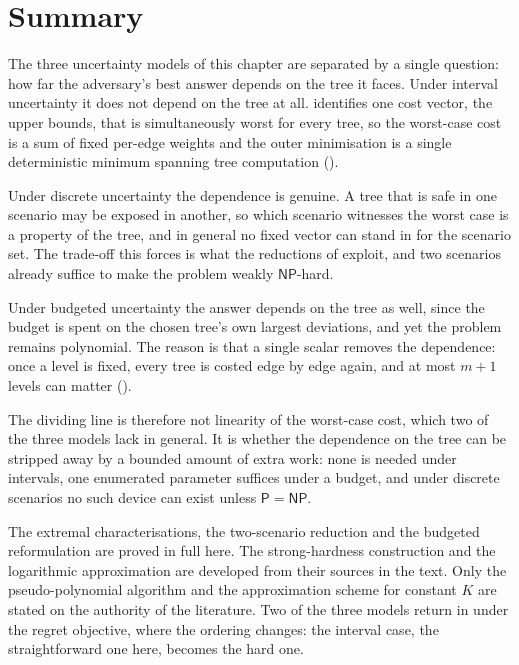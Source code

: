 \section*{Summary}

The three uncertainty models of this chapter are separated by a single question: how far the adversary's best answer depends on the tree it faces.
Under interval uncertainty it does not depend on the tree at all.
 identifies one cost vector, the upper bounds, that is simultaneously worst for every tree, so the worst-case cost is a sum of fixed per-edge weights and the outer minimisation is a single deterministic minimum spanning tree computation ().

Under discrete uncertainty the dependence is genuine.
A tree that is safe in one scenario may be exposed in another, so which scenario witnesses the worst case is a property of the tree, and in general no fixed vector can stand in for the scenario set.
The trade-off this forces is what the reductions of  exploit, and two scenarios already suffice to make the problem weakly $\mathsf{NP}$-hard.

Under budgeted uncertainty the answer depends on the tree as well, since the budget is spent on the chosen tree's own largest deviations, and yet the problem remains polynomial.
The reason is that a single scalar removes the dependence: once a level is fixed, every tree is costed edge by edge again, and at most $m + 1$ levels can matter ().

The dividing line is therefore not linearity of the worst-case cost, which two of the three models lack in general.
It is whether the dependence on the tree can be stripped away by a bounded amount of extra work: none is needed under intervals, one enumerated parameter suffices under a budget, and under discrete scenarios no such device can exist unless $\mathsf{P} = \mathsf{NP}$.

The extremal characterisations, the two-scenario reduction and the budgeted reformulation are proved in full here. The strong-hardness construction and the logarithmic approximation are developed from their sources in the text. Only the pseudo-polynomial algorithm and the approximation scheme for constant $K$ are stated on the authority of the literature.
Two of the three models return in  under the regret objective, where the ordering changes: the interval case, the straightforward one here, becomes the hard one.

